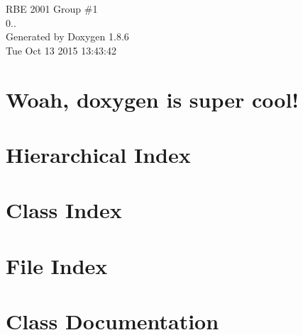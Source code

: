 \documentclass[twoside]{book}
\newcommand{\clearemptydoublepage}{%
  \newpage{\pagestyle{empty}\cleardoublepage}%
}
\begin{document}
\hypersetup{pageanchor=false}
\begin{titlepage}
\vspace*{7cm}
\begin{center}%
{\Large R\-B\-E 2001 Group \#1 \\[1ex]\large 0.. }\\
\vspace*{1cm}
{\large Generated by Doxygen 1.8.6}\\
\vspace*{0.5cm}
{\small Tue Oct 13 2015 13:43:42}\\
\end{center}
\end{titlepage}
\clearemptydoublepage
\tableofcontents
\clearemptydoublepage
{}
\hypersetup{pageanchor=true}

\chapter{Woah, doxygen is super cool!}
\label{index}\hypertarget{index}{}
\chapter{Hierarchical Index}

\chapter{Class Index}

\chapter{File Index}

\chapter{Class Documentation}


































\end{document}
